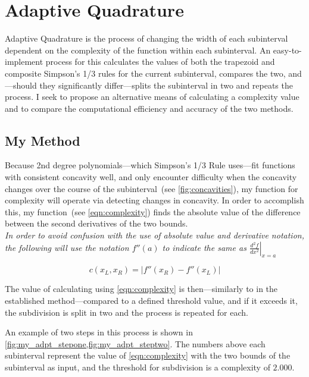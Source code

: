 \documentclass{paper}
\begin{document}
\section{Adaptive Quadrature}
\label{sec:adaptive}
Adaptive Quadrature is the process of changing the width of each subinterval dependent on the complexity of the function within each subinterval.
An easy-to-implement process for this calculates the values of both the trapezoid and composite Simpson's 1/3 rules for the current subinterval, compares the two, and---should they significantly differ---splits the subinterval in two and repeats the process.\autocite[p. 1]{established}
I seek to propose an alternative means of calculating a complexity value and to compare the computational efficiency and accuracy of the two methods.

\subsection{My Method}
\label{sec:my_method}
Because 2nd degree polynomials---which Simpson's 1/3 Rule uses---fit functions with consistent concavity well, and only encounter difficulty when the concavity changes over the course of the subinterval~(see \cref{fig:concavities}), my function for complexity will operate via detecting changes in concavity.
In order to accomplish this, my function~(see \cref{eqn:complexity}) finds the absolute value of the difference between the second derivatives of the two bounds.\\
\emph{In order to avoid confusion with the use of absolute value and derivative notation, the following will use the notation \(f''(a)\) to indicate the same as \(\left.\frac{d^2f}{dx^2}\right|_{x=a}\)}



\begin{equation}
    \label{eqn:complexity}
    c(x_L, x_R) = \left|f''(x_R) - f''(x_L)\right|
\end{equation}

The value of calculating using \cref{eqn:complexity} is then---similarly to in the established method---compared to a defined threshold value, and if it exceeds it, the subdivision is split in two and the process is repeated for each.

An example of two steps in this process is shown in \cref{fig:my_adpt_stepone,fig:my_adpt_steptwo}.
The numbers above each subinterval represent the value of \cref{eqn:complexity} with the two bounds of the subinterval as input, and the threshold for subdivision is a complexity of \(2.000\).
\end{document}
